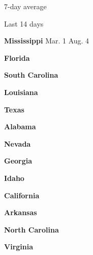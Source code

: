 7-day average

Last 14 days

\textbf{Mississippi} Mar. 1 Aug. 4

\href{https://www.nytimes3xbfgragh.onion/interactive/2020/us/florida-coronavirus-cases.html}{}

\textbf{Florida}

\href{https://www.nytimes3xbfgragh.onion/interactive/2020/us/south-carolina-coronavirus-cases.html}{}

\textbf{South Carolina}

\href{https://www.nytimes3xbfgragh.onion/interactive/2020/us/louisiana-coronavirus-cases.html}{}

\textbf{Louisiana}

\href{https://www.nytimes3xbfgragh.onion/interactive/2020/us/texas-coronavirus-cases.html}{}

\textbf{Texas}

\href{https://www.nytimes3xbfgragh.onion/interactive/2020/us/alabama-coronavirus-cases.html}{}

\textbf{Alabama}

\href{https://www.nytimes3xbfgragh.onion/interactive/2020/us/nevada-coronavirus-cases.html}{}

\textbf{Nevada}

\href{https://www.nytimes3xbfgragh.onion/interactive/2020/us/georgia-coronavirus-cases.html}{}

\textbf{Georgia}

\href{https://www.nytimes3xbfgragh.onion/interactive/2020/us/idaho-coronavirus-cases.html}{}

\textbf{Idaho}

\href{https://www.nytimes3xbfgragh.onion/interactive/2020/us/california-coronavirus-cases.html}{}

\textbf{California}

\href{https://www.nytimes3xbfgragh.onion/interactive/2020/us/arkansas-coronavirus-cases.html}{}

\textbf{Arkansas}

\href{https://www.nytimes3xbfgragh.onion/interactive/2020/us/north-carolina-coronavirus-cases.html}{}

\textbf{North Carolina}

\href{https://www.nytimes3xbfgragh.onion/interactive/2020/us/virginia-coronavirus-cases.html}{}

\textbf{Virginia}

\href{https://www.nytimes3xbfgragh.onion/interactive/2020/us/ohio-coronavirus-cases.html}{}

